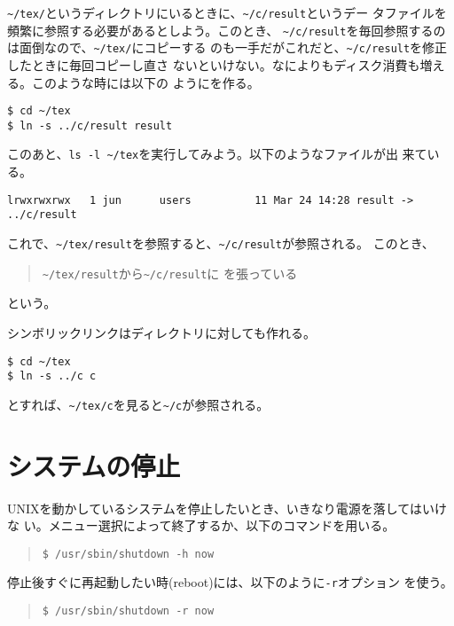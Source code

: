 \documentclass{jreport}
\begin{document}
\verb|~/tex/|というディレクトリにいるときに、\verb|~/c/result|というデー
タファイルを頻繁に参照する必要があるとしよう。このとき、
\verb|~/c/result|を毎回参照するのは面倒なので、\verb|~/tex/|にコピーする
のも一手だがこれだと、\verb|~/c/result|を修正したときに毎回コピーし直さ
ないといけない。なによりもディスク消費も増える。このような時には以下の
ようにを作る。
\begin{screen}
\begin{verbatim}
$ cd ~/tex
$ ln -s ../c/result result
\end{verbatim}
\end{screen}
このあと、\verb|ls -l ~/tex|を実行してみよう。以下のようなファイルが出
来ている。
\begin{screen}
\begin{verbatim}
lrwxrwxrwx   1 jun      users          11 Mar 24 14:28 result -> ../c/result
\end{verbatim}
\end{screen}
これで、\verb|~/tex/result|を参照すると、\verb|~/c/result|が参照される。
このとき、
\begin{quote}
  \verb|~/tex/result|から\verb|~/c/result|に
  を張っている
\end{quote}
という。

シンボリックリンクはディレクトリに対しても作れる。
\begin{screen}
\begin{verbatim}
$ cd ~/tex
$ ln -s ../c c
\end{verbatim}
\end{screen}
とすれば、\verb|~/tex/c|を見ると\verb|~/c|が参照される。

\section{システムの停止}

UNIXを動かしているシステムを停止したいとき、いきなり電源を落してはいけな
い。メニュー選択によって終了するか、以下のコマンドを用いる。
\begin{quote}
\begin{verbatim}
$ /usr/sbin/shutdown -h now
\end{verbatim}
\end{quote}
停止後すぐに再起動したい時(reboot)には、以下のように\verb|-r|オプション
を使う。
\begin{quote}
\begin{verbatim}
$ /usr/sbin/shutdown -r now
\end{verbatim}
\end{quote}
\end{document}
